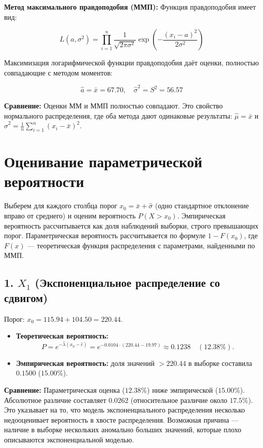 \textbf{Метод максимального правдоподобия (ММП):} Функция правдоподобия имеет вид:

$$
L(a, \sigma^2) = \prod_{i=1}^{n} \frac{1}{\sqrt{2\pi\sigma^2}} \exp\left( -\frac{(x_i - a)^2}{2\sigma^2} \right)
$$

Максимизация логарифмической функции правдоподобия даёт оценки, полностью совпадающие с методом моментов:

$$
\hat{a} = \bar{x} = 67.70, \quad \hat{\sigma}^2 = S^2 = 56.57
$$

\textbf{Сравнение:} Оценки ММ и ММП полностью совпадают. Это свойство нормального распределения, где оба метода дают одинаковые результаты: $\hat{\mu} = \bar{x}$ и $\hat{\sigma}^2 = \frac{1}{n}\sum_{i=1}^{n}(x_i - \bar{x})^2$.

\section{Оценивание параметрической вероятности}

Выберем для каждого столбца порог $x_0 = \bar{x} + \hat{\sigma}$ (одно стандартное отклонение вправо от среднего) и оценим вероятность $P(X > x_0)$. Эмпирическая вероятность рассчитывается как доля наблюдений выборки, строго превышающих порог. Параметрическая вероятность рассчитывается по формуле $1 - F(x_0)$, где $F(x)$ — теоретическая функция распределения с параметрами, найденными по ММП.

\subsection{1. $X_1$ (Экспоненциальное распределение со сдвигом)}

Порог: $x_0 = 115.94 + 104.50 = 220.44$.

\begin{itemize}
    \item \textbf{Теоретическая вероятность:} 
    $$
    P = e^{-\hat{\lambda}(x_0 - \hat{c})} = e^{-0.0104 \cdot (220.44 - 19.97)} \approx 0.1238 \quad (12.38\%).
    $$
    \item \textbf{Эмпирическая вероятность:} доля значений $> 220.44$ в выборке составила $0.1500$ ($15.00\%$).
\end{itemize}

\textbf{Сравнение:} Параметрическая оценка ($12.38\%$) ниже эмпирической ($15.00\%$). Абсолютное различие составляет $0.0262$ (относительное различие около $17.5\%$). Это указывает на то, что модель экспоненциального распределения несколько недооценивает вероятность в хвосте распределения. Возможная причина — наличие в выборке нескольких аномально больших значений, которые плохо описываются экспоненциальной моделью.

